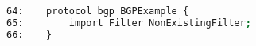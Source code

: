 \begin{lstlisting}[language=bash, caption={Bird4.conf contents}]
64:    protocol bgp BGPExample {
65:        import Filter NonExistingFilter;
66:    }
\end{lstlisting}